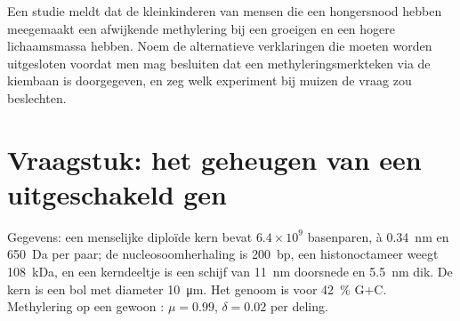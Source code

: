 \begin{exercise}[$\star\star\star$]\label{exo:b3:chromatin-epigenetics:12}
Een studie meldt dat de kleinkinderen van mensen die een hongersnood
hebben meegemaakt een afwijkende methylering bij een groeigen en een
hogere lichaamsmassa hebben. Noem de alternatieve verklaringen die
moeten worden uitgesloten voordat men mag besluiten dat een
methyleringsmerkteken via de kiembaan is doorgegeven, en zeg welk
experiment bij muizen de vraag zou beslechten.
\end{exercise}

\section{Vraagstuk: het geheugen van een uitgeschakeld gen}

\begin{problem}
\label{pb:b3:chromatin-epigenetics:1}
Gegevens: een menselijke diploïde kern bevat $6.4\times 10^{9}$
basenparen, à \qty{0.34}{nm} en \qty{650}{Da} per paar; de
nucleosoomherhaling is \qty{200}{bp}, een histonoctameer weegt
\qty{108}{kDa}, en een kerndeeltje is een schijf van \qty{11}{nm}
doorsnede en \qty{5.5}{nm} dik. De kern is een bol met diameter
\qty{10}{\micro m}. Het genoom is voor \qty{42}{\%} G$+$C. Methylering
op een gewoon : $\mu = 0.99$, $\delta = 0.02$ per deling.


\end{problem}
